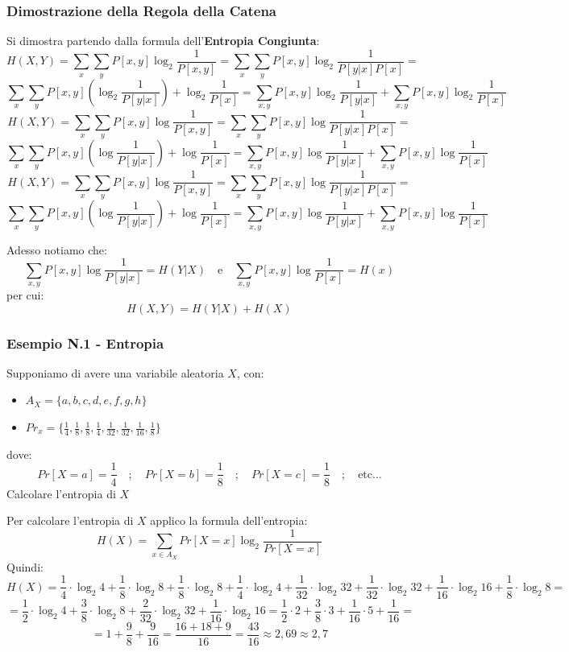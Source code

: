 \subsubsection{Dimostrazione della Regola della Catena}
Si dimostra partendo dalla formula dell'\textbf{Entropia Congiunta}:
$$
H(X,Y) = \sum_x\sum_yP[x,y]\log_{2}\frac{1}{P[x,y]}=\sum_x\sum_y P[x,y]\log_{2}\frac{1}{P[y|x]P[x]}=
$$
$$
\sum_x\sum_yP[x,y](\log_{2}\frac{1}{P[y|x]} ) + \log_{2} \frac{1}{P[x]} = \sum_{x,y}P[x,y] \log_{2}\frac{1}{P[y|x]} + \sum_{x,y}P[x,y]\log_{2}\frac{1}{P[x]}
$$
$$
H(X,Y) = \sum_x\sum_yP[x,y]\log\frac{1}{P[x,y]}=\sum_x\sum_y P[x,y]\log\frac{1}{P[y|x]P[x]}=
$$
$$\sum_x\sum_yP[x,y](\log\frac{1}{P[y|x]})+\log\frac{1}{P[x]} =
\sum_{x,y}P[x,y]\log\frac{1}{P[y|x]}+\sum_{x,y}P[x,y]\log\frac{1}{P[x]}
$$
$$
H(X,Y) = \sum_x\sum_yP[x,y]\log\frac{1}{P[x,y]} = \sum_x\sum_y P[x,y]\log\frac{1}{P[y|x]P[x]} =
$$
$$
\sum_x\sum_yP[x,y](\log\frac{1}{P[y|x]}) + \log\frac{1}{P[x]} =
\sum_{x,y}P[x,y]\log\frac{1}{P[y|x]} + \sum_{x,y}P[x,y]\log\frac{1}{P[x]}
$$

Adesso notiamo che:
$$
\sum_{x,y} P[x,y]\log\frac{1}{P[y|x]} = H(Y|X) \quad \text{e} \quad \sum_{x,y}P[x,y]\log\frac{1}{P[x]} = H(x)
$$
per cui:
$$
H(X,Y) = H(Y|X)+H(X)
$$

\newpage
\subsubsection{Esempio N.1 - Entropia}
Supponiamo di avere una variabile aleatoria $X$, con:
\begin{itemize}
	\item $A_X = \{a,b,c,d,e,f,g,h\}$
	\item $Pr_x = \{\frac{1}{4},\frac{1}{8},\frac{1}{8},\frac{1}{4},\frac{1}{32},\frac{1}{32},\frac{1}{16},\frac{1}{8}\}$
\end{itemize}
dove:
$$
Pr[X=a] = \frac{1}{4}\quad;\quad Pr[X=b] = \frac{1}{8}\quad;\quad Pr[X=c] = \frac{1}{8} \quad; \quad \text{etc...}
$$
Calcolare l'entropia di $X$

Per calcolare l'entropia di $X$ applico la formula dell'entropia:
$$
H(X) = \sum_{x\in A_X} Pr[X = x] \log_{2} \frac{1}{Pr[X = x]}
$$
Quindi:
$$
H(X) = \frac{1}{4}\cdot\log_{2}4 + \frac{1}{8}\cdot\log_{2}8 + \frac{1}{8}\cdot\log_{2}8 + \frac{1}{4}\cdot\log_{2}4 + \frac{1}{32}\cdot\log_{2}32 + \frac{1}{32}\cdot\log_{2}32 + \frac{1}{16}\cdot\log_{2}16 + \frac{1}{8}\cdot\log_{2}8 =
$$
$$
= \frac{1}{2}\cdot\log_{2}4 + \frac{3}{8}\cdot\log_{2}8 + \frac{2}{32}\cdot\log_{2}32 + \frac{1}{16}\cdot\log_{2}16 = \frac{1}{2}\cdot2 + \frac{3}{8}\cdot3 + \frac{1}{16}\cdot5 + \frac{1}{16} =
$$
$$
= 1 + \frac{9}{8} + \frac{9}{16} = \frac{16 + 18 + 9}{16} = \frac{43}{16} \approx 2,69 \approx 2,7
$$

